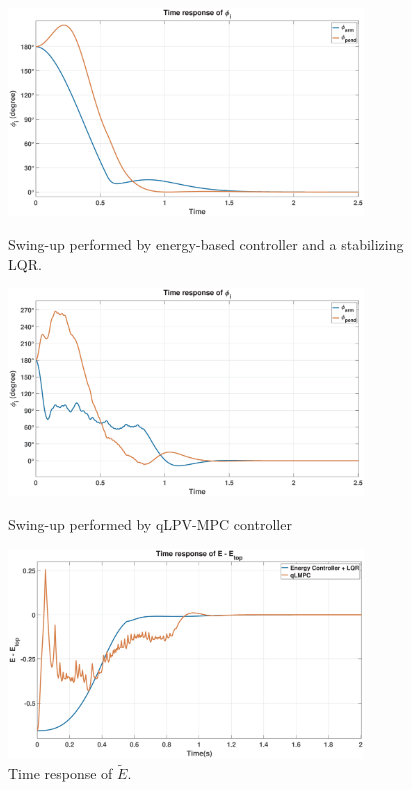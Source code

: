 \begin{figure}[H]
    \centering
    \includegraphics[width=0.84\textwidth]{figures/Swing_up}
    \caption{Swing-up performed by energy-based controller and a stabilizing LQR.}
    \label{fig:swing_up}
\vspace{0.004em}
    \centering
    \includegraphics[width=0.84\textwidth]{figures/qLMPC_swingup}
    \caption{Swing-up performed by qLPV-MPC controller}
    \label{fig:swing_up_qLMPC}
\vspace{0.004em}
    \centering
    \includegraphics[width=0.84\textwidth]{figures/Etilda_comb}
    \caption{Time response of $\tilde{E}$.}
    \label{fig:Etilda}
\end{figure}
